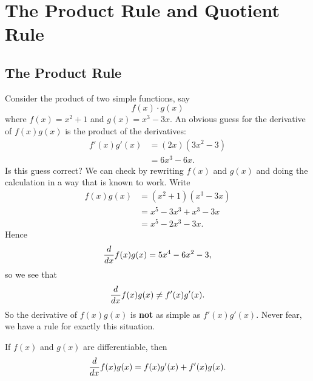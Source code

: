 \chapter{The Product Rule and Quotient Rule}

\section{The Product Rule}


Consider the product of two simple functions, say
\[
f(x)\cdot g(x)
\]
where $f(x)=x^2+1$ and $g(x)=x^3-3x$. An obvious guess for the
derivative of $f(x)g(x)$ is the product of the derivatives:
\begin{align*}
f'(x)g'(x) &= (2x)(3x^2-3)\\
&= 6x^3-6x.
\end{align*}
Is this guess correct? We can check by rewriting $f(x)$
and $g(x)$ and doing the calculation in a way that is known to
work. Write 
\begin{align*}
f(x)g(x) &= (x^2+1)(x^3-3x)\\
&=x^5-3x^3+x^3-3x\\
&=x^5-2x^3-3x.
\end{align*} 
Hence
\[
\frac{d}{dx} f(x) g(x) = 5x^4-6x^2-3, 
\]
so we see that 
\[
\frac{d}{dx} f(x) g(x) \ne  f'(x)g'(x).
\]
So the derivative of $f(x)g(x)$ is \textbf{not} as simple as
$f'(x)g'(x)$. Never fear, we have a rule for exactly this
situation.
\begin{mainTheorem}\label{theorem:product-rule}
If $f(x)$ and $g(x)$ are differentiable, then
\[
\frac{d}{dx} f(x)g(x) = f(x)g'(x)+f'(x)g(x).
\]
\end{mainTheorem}

